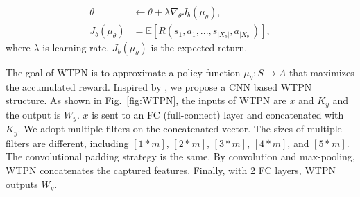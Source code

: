 \begin{align}
\theta &\leftarrow \theta + \lambda \nabla_\theta J_b(\mu_\theta),\\
J_b(\mu_\theta) &= \mathbb{E} [R(s_1, a_1, ..., s_{|X_b|},a_{|X_b|}) ],
\end{align}
where $\lambda$ is learning rate. $J_b(\mu_\theta)$ is the expected return.

The goal of WTPN is to approximate a policy function $\mu_\theta :S \to A$ that maximizes the accumulated reward.  Inspired by \cite{DBLP:conf/aaai/KimJSR16}, we propose a CNN based WTPN structure. As shown in Fig.~\ref{fig:WTPN}, the inputs of WTPN are $x$ and $K_y$ and the output is $W_y$. $x$ is sent to an FC (full-connect) layer and concatenated with $K_y$. We adopt multiple filters on the concatenated vector. The sizes of multiple filters are different, including $[1*m]$,  $[2*m]$, $[3*m]$, $[4*m]$, and $[5*m]$. The convolutional padding strategy is the same. By convolution and max-pooling, WTPN concatenates the captured features. Finally, with 2 FC layers, WTPN outputs $W_y$. 